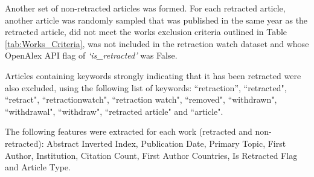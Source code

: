 \documentclass[pdflatex,sn-mathphys-num]{sn-jnl}%
\begin{document}







Another set of non-retracted articles was formed. For each retracted article, another article was randomly sampled that was published in the same year as the retracted article, did not meet the works exclusion criteria outlined in Table \ref{tab:Works_Criteria}, was not included in the retraction watch dataset and whose OpenAlex API flag of \textit{`is\_retracted'} was False.

Articles containing keywords strongly indicating that it has been retracted were also excluded, using the following list of keywords: ``retraction'', ``retracted", ``retract", ``retractionwatch", ``retraction watch", ``removed", ``withdrawn", ``withdrawal", ``withdraw", ``retracted article" and ``article".




The following features were extracted for each work (retracted and non-retracted): Abstract Inverted Index, Publication Date, Primary Topic, First Author, Institution, Citation Count, First Author Countries, Is Retracted Flag and Article Type.
\end{document}
